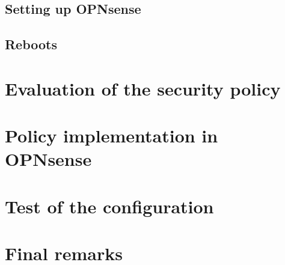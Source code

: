 \documentclass[draft]{homework}
\newcommand{\opn}{OPNsense\xspace}
\begin{document}
    \subsection{Setting up \opn}
    
    \subsection{Reboots}
    
    
    \section{Evaluation of the security policy}
    
    
    \section{Policy implementation in \opn}
    
    
    \section{Test of the configuration}
    
    \section{Final remarks}
\end{document}

